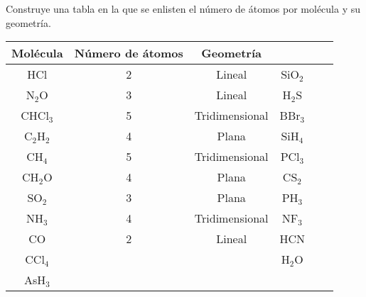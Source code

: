 \question[20] Construye una tabla en la que se enlisten el
número de átomos por molécula y su geometría.

\renewcommand{\arraystretch}{1.5}
\ifprintanswers
    \begin{table}[H]
        \centering
        \begin{tabular}{c|c|c|c|c|c}
            \rowcolor[HTML]{F8A102}
            Molécula   & Número de átomos & Geometría                     \\ \hline
            HCl        & 2                & Lineal         & SiO$_2$ &  & \\
            N$_2$O     & 3                & Lineal         & H$_2$S  &  & \\
            CHCl$_3$   & 5                & Tridimensional & BBr$_3$ &  & \\
            C$_2$H$_2$ & 4                & Plana          & SiH$_4$ &  & \\
            CH$_4$     & 5                & Tridimensional & PCl$_3$ &  & \\
            CH$_2$O    & 4                & Plana          & CS$_2$  &  & \\
            SO$_2$     & 3                & Plana          & PH$_3$  &  & \\
            NH$_3$     & 4                & Tridimensional & NF$_3$  &  & \\
            CO         & 2                & Lineal         & HCN     &  & \\
            CCl$_4$    &                  &                & H$_2$O  &  & \\
            AsH$_3$    &                  &                &         &  & \\
        \end{tabular}
    \end{table}
\else
